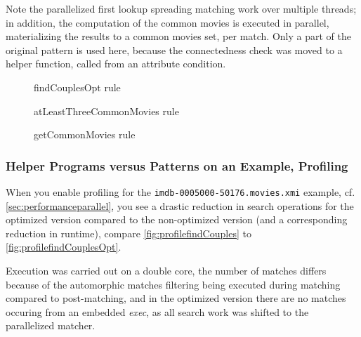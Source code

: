 Note the parallelized first lookup spreading matching work over multiple threads; in addition, the computation of the common movies is executed in parallel, materializing the results to a common movies set, per match.
Only a part of the original pattern is used here, because the connectedness check was moved to a helper function, called from an attribute condition.

\begin{figure}[hptb]
	
	\caption{findCouplesOpt rule}
	\label{fig:findCouplesOpt.grg}
\end{figure}

\begin{figure}[hptb]
	
	\caption{atLeastThreeCommonMovies rule}
	\label{fig:atLeastThreeCommonMovies.grg}
\end{figure}

\begin{figure}[hptb]
	
	\caption{getCommonMovies rule}
	\label{fig:getCommonMovies.grg}
\end{figure}

\subsubsection*{Helper Programs versus Patterns on an Example, Profiling}

When you enable profiling for the \verb#imdb-0005000-50176.movies.xmi# example, cf. \ref{sec:performanceparallel}, you see a drastic reduction in search operations for the optimized version compared to the non-optimized version (and a corresponding reduction in runtime), compare \ref{fig:profilefindCouples} to \ref{fig:profilefindCouplesOpt}. 

Execution was carried out on a double core, the number of matches differs because of the automorphic matches filtering being executed during matching compared to post-matching, and in the optimized version there are no matches occuring from an embedded \emph{exec}, as all search work was shifted to the parallelized matcher.


